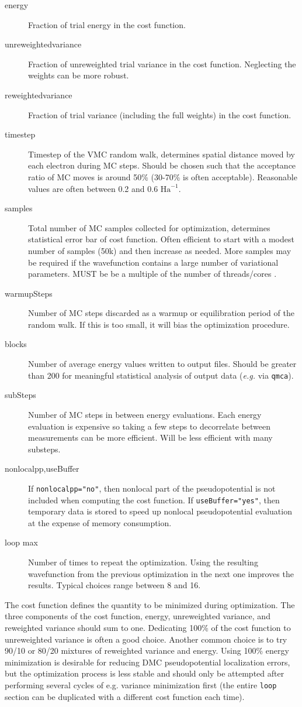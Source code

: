 \begin{description}
  \item[energy] Fraction of trial energy in the cost function.
  \item[unreweightedvariance] Fraction of unreweighted trial variance in the cost function.  Neglecting the weights can be more robust.
  \item[reweightedvariance] Fraction of trial variance (including the full weights) in the cost function.  
  \item[timestep] Timestep of the VMC random walk, determines spatial distance moved by each electron during MC steps.  Should be chosen such that the acceptance ratio of MC moves is around 50\% (30-70\% is often acceptable).  Reasonable values are often between 0.2 and 0.6 $\textrm{Ha}^{-1}$.
  \item[samples] Total number of MC samples collected for optimization, determines statistical error bar of cost function.  Often efficient to start with a modest number of samples (50k) and then increase as needed.  More samples may be required if the wavefunction contains a large number of variational parameters.  MUST be be a multiple of the number of threads/cores .
  \item[warmupSteps]  Number of MC steps discarded as a warmup or equilibration period of the random walk.  If this is too small, it will bias the optimization procedure.
  \item[blocks]  Number of average energy values written to output files.  Should be greater than 200 for meaningful statistical analysis of output data (\emph{e.g.} via \texttt{qmca}).
  \item[subSteps] Number of MC steps in between energy evaluations.  Each energy evaluation is expensive so taking a few steps to decorrelate between measurements can be more efficient.  Will be less efficient with many substeps.
  \item[nonlocalpp,useBuffer] If \texttt{nonlocalpp="no"}, then nonlocal part of the pseudopotential is not included when computing the cost function.  If \texttt{useBuffer="yes"}, then temporary data is stored to speed up nonlocal pseudopotential evaluation at the expense of memory consumption.  
  \item[loop max] Number of times to repeat the optimization.  Using the resulting wavefunction from the previous optimization in the next one improves the results.  Typical choices range between 8 and 16.   
\end{description}
The cost function defines the quantity to be minimized during optimization. The three components of the cost function, energy, unreweighted variance, and reweighted variance should sum to one.  Dedicating 100\% of the cost function to unreweighted variance is often a good choice.  Another common choice is to try 90/10 or 80/20 mixtures of reweighted variance and energy.  Using 100\% energy minimization is desirable for reducing DMC pseudopotential localization errors, but the optimization process is less stable and should only be attempted after performing several cycles of e.g. variance minimization first (the entire \texttt{loop} section can be duplicated with a different cost function each time).

